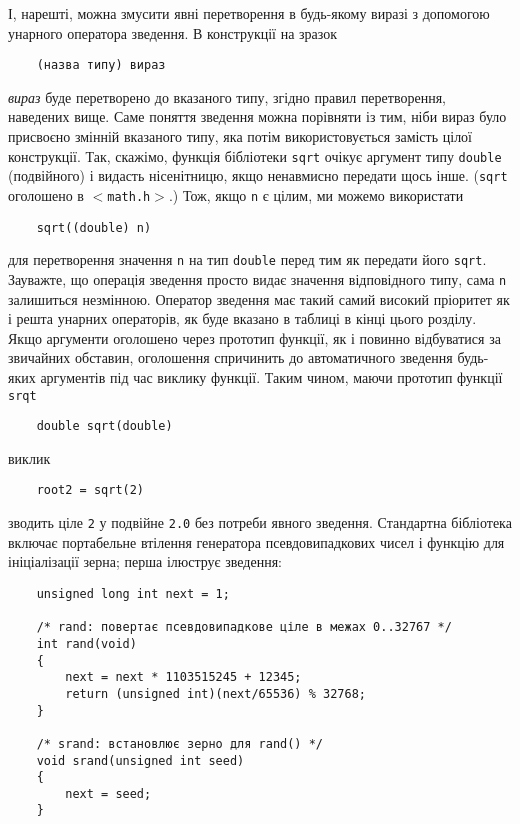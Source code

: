 \documentclass[a4paper,12pt]{book}
\begin{document}
  І, нарешті, можна змусити явні перетворення в будь-якому виразі з допомогою унарного
  оператора зведення. В конструкції на зразок
  \begin{verbatim}
    (назва типу) вираз
  \end{verbatim}
  \textit{вираз} буде перетворено до вказаного типу, згідно правил перетворення, наведених
  вище. Саме поняття зведення можна порівняти із тим, ніби вираз було присвоєно змінній
  вказаного типу, яка потім використовується замість цілої конструкції. Так, скажімо,
  функція бібліотеки \texttt{sqrt} очікує аргумент типу \texttt{double} (подвійного) і
  видасть нісенітницю, якщо ненавмисно передати щось інше. (\texttt{sqrt} оголошено в
  \texttt{\mbox{$<$}math.h\mbox{$>$}}.) Тож, якщо \texttt{n} є цілим, ми можемо використати
  \begin{verbatim}
    sqrt((double) n)
  \end{verbatim}
  для перетворення значення \texttt{n} на тип \texttt{double} перед тим як передати його
  \texttt{sqrt}. Зауважте, що операція зведення просто видає значення відповідного типу,
  сама \texttt{n} залишиться незмінною. Оператор зведення має такий самий високий
  пріоритет як і решта унарних операторів, як буде вказано в таблиці в кінці цього
  розділу. Якщо аргументи оголошено через прототип функції, як і повинно відбуватися за
  звичайних обставин, оголошення спричинить до автоматичного зведення будь-яких аргументів
  під час виклику функції. Таким чином, маючи прототип функції
  \texttt{srqt}
  \begin{verbatim}
    double sqrt(double)
  \end{verbatim}
  виклик
  \begin{verbatim}
    root2 = sqrt(2)
  \end{verbatim}
  зводить ціле \texttt{2} у подвійне \texttt{2.0} без потреби явного зведення. Стандартна
  бібліотека включає портабельне втілення генератора псевдовипадкових чисел і функцію для
  ініціалізації зерна; перша ілюструє зведення:
  \begin{verbatim}
    unsigned long int next = 1;

    /* rand: повертає псевдовипадкове ціле в межах 0..32767 */
    int rand(void)
    {
        next = next * 1103515245 + 12345;
        return (unsigned int)(next/65536) % 32768;
    }

    /* srand: встановлює зерно для rand() */
    void srand(unsigned int seed)
    {
        next = seed;
    }
  \end{verbatim}
\end{document}
